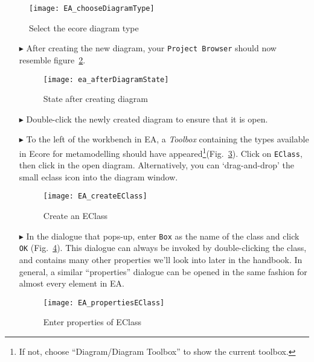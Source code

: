 \pagebreak

\begin{figure}[htbp]
	\centering
  \texttt{[image: EA\_chooseDiagramType]}
	\caption{Select the ecore diagram type}
	\label{fig:diagram_type}
\end{figure}
\FloatBarrier

\begin{itemize}
 
\item[$\blacktriangleright$] After creating the new diagram, your  \texttt{Project Browser} should now resemble figure~\ref{fig:diagram_completed}.

\begin{figure}[htbp]
	\centering
  \texttt{[image: ea\_afterDiagramState]}
	\caption{State after creating diagram}
	\label{fig:diagram_completed}
\end{figure}


\item[$\blacktriangleright$] Double-click the newly created diagram to ensure that it is open.


\item[$\blacktriangleright$] To the left of the workbench in EA, a \emph{Toolbox} containing the types available in Ecore for metamodelling should have appeared\footnote{If not, choose ``Diagram/Diagram Toolbox'' to show the current toolbox.}(Fig.~\ref{fig:eclass}). Click on \texttt{EClass}, then click in the open diagram. Alternatively, you can `drag-and-drop' the small eclass icon into the diagram window.

\begin{figure}[htbp]
	\centering
  \texttt{[image: EA\_createEClass]}
	\caption{Create an EClass}
	\label{fig:eclass}
\end{figure}



\item[$\blacktriangleright$] In the dialogue that pops-up, enter \texttt{Box} as the name of the class and click \texttt{OK} (Fig.~\ref{fig:eclass_properties}).
This dialogue can always be invoked by double-clicking the class, and contains many other properties we'll look into later in the handbook.
In general, a similar ``properties'' dialogue can be opened in the same fashion for almost every element in EA.

\begin{figure}[htbp]
	\centering
  \texttt{[image: EA\_propertiesEClass]}
	\caption{Enter properties of EClass}
	\label{fig:eclass_properties}
\end{figure}


\end{itemize}
